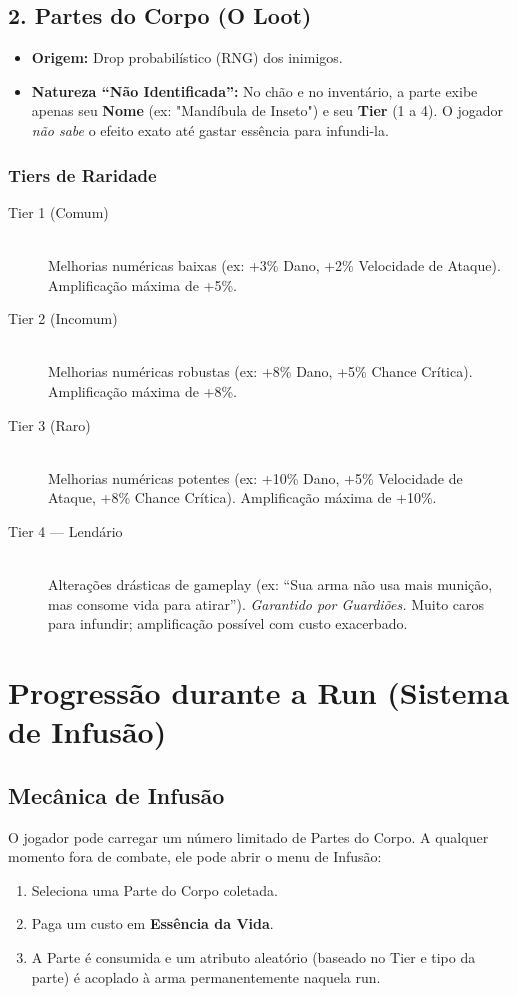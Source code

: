 \documentclass[a4paper,12pt]{report}
\begin{document}
\subsection{2. Partes do Corpo (O Loot)}
\begin{itemize}
    \item \textbf{Origem:} Drop probabilístico (RNG) dos inimigos.
    \item \textbf{Natureza ``Não Identificada'':} No chão e no inventário, a parte exibe apenas seu \textbf{Nome} (ex: "Mandíbula de Inseto") e seu \textbf{Tier} (1 a 4). O jogador \textit{não sabe} o efeito exato até gastar essência para infundi-la.
\end{itemize}

\subsubsection{Tiers de Raridade}
\begin{description}
    \item[Tier 1 (Comum)] \hfill \\
    Melhorias numéricas baixas (ex: +3\% Dano, +2\% Velocidade de Ataque). Amplificação máxima de +5\%.
    \item[Tier 2 (Incomum)] \hfill \\
    Melhorias numéricas robustas (ex: +8\% Dano, +5\% Chance Crítica). Amplificação máxima de +8\%.
    \item[Tier 3 (Raro)] \hfill \\
    Melhorias numéricas potentes (ex: +10\% Dano, +5\% Velocidade de Ataque, +8\% Chance Crítica). Amplificação máxima de +10\%.
    \item[Tier 4 --- Lendário] \hfill \\
    Alterações drásticas de gameplay (ex: ``Sua arma não usa mais munição, mas consome vida para atirar''). \textit{Garantido por Guardiões.} Muito caros para infundir; amplificação possível com custo exacerbado.
\end{description}

\section{Progressão durante a Run (Sistema de Infusão)}

\subsection{Mecânica de Infusão}
O jogador pode carregar um número limitado de Partes do Corpo. A qualquer momento fora de combate, ele pode abrir o menu de Infusão:
\begin{enumerate}
    \item Seleciona uma Parte do Corpo coletada.
    \item Paga um custo em \textbf{Essência da Vida}.
    \item A Parte é consumida e um atributo aleatório (baseado no Tier e tipo da parte) é acoplado à arma permanentemente naquela run.
\end{enumerate}
\end{document}
